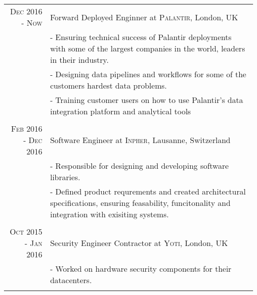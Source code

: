 \documentclass[a4paper,10pt]{article} %
\begin{document}
\begin{tabular}{r|p{11cm}}
    \textsc{Dec 2016 - Now} & Forward Deployed Enginner at \textsc{Palantir}, London, UK\\
                            & \footnotesize{
                                - Ensuring technical success of Palantir deployments with some of the largest companies in the world, leaders in their industry.
                            }\\
                            & \footnotesize{
                                - Designing data pipelines and workflows for some of the customers hardest data problems.
                            }\\
                            & \footnotesize{
                                - Training customer users on how to use Palantir's data integration platform and analytical tools
                            }\\
\multicolumn{2}{c}{} \\
    \textsc{Feb 2016 - Dec 2016} & Software Engineer at \textsc{Inpher}, Lausanne, Switzerland\\
                                & \footnotesize{
                                    - Responsible for designing and developing software libraries.
                                }\\
                                & \footnotesize{
                                    - Defined product requrements and created architectural specifications, ensuring feasability, funcitonality and integration
                                    with exisiting systems.
                                }\\
\multicolumn{2}{c}{} \\
    \textsc{Oct 2015 - Jan 2016} & Security Engineer Contractor at \textsc{Yoti}, London, UK\\
                              & \footnotesize{
                                  - Worked on hardware security components for their datacenters.}\\
\multicolumn{2}{c}{} \\


\end{tabular}
\end{document}
